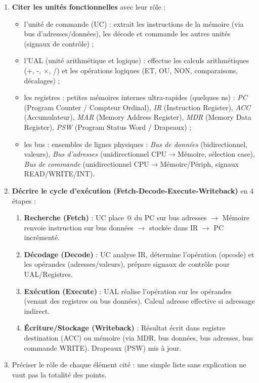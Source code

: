 \documentclass[11pt]{article}
\newcommand{\cle}[1]{{\popxbold\color{popdark}#1}}
\begin{document}
\begin{methode}
\begin{enumerate}
\item \textbf{Citer les unités fonctionnelles} avec leur rôle :
\begin{itemize}
\item l'\cle{unité de commande} (UC) : extrait les instructions de la mémoire (via bus d'adresses/données), les décode et commande les autres unités (signaux de contrôle) ;
\item l'\cle{UAL} (unité arithmétique et logique) : effectue les calculs arithmétiques (+, -, $\times$, /) et les opérations logiques (ET, OU, NON, comparaisons, décalages) ;
\item les \cle{registres} : petites mémoires internes ultra-rapides (quelques ns) : \emph{PC} (Program Counter / Compteur Ordinal), \emph{IR} (Instruction Register), \emph{ACC} (Accumulateur), \emph{MAR} (Memory Address Register), \emph{MDR} (Memory Data Register), \emph{PSW} (Program Status Word / Drapeaux) ;
\item les \cle{bus} : ensembles de lignes physiques : \emph{Bus de données} (bidirectionnel, valeurs), \emph{Bus d'adresses} (unidirectionnel CPU$\to$Mémoire, sélection case), \emph{Bus de commande} (unidirectionnel CPU$\to$Mémoire/Périph, signaux READ/WRITE/INT).
\end{itemize}
\item \textbf{Décrire le cycle d'exécution (Fetch-Decode-Execute-Writeback)} en 4 étapes :
\begin{enumerate}
\item \textbf{Recherche (Fetch)} : UC place @ du PC sur bus adresses $\to$ Mémoire renvoie instruction sur bus données $\to$ stockée dans IR $\to$ PC incrémenté.
\item \textbf{Décodage (Decode)} : UC analyse IR, détermine l'opération (opcode) et les opérandes (adresses/valeurs), prépare signaux de contrôle pour UAL/Registres.
\item \textbf{Exécution (Execute)} : UAL réalise l'opération sur les opérandes (venant des registres ou bus données). Calcul adresse effective si adressage indirect.
\item \textbf{Écriture/Stockage (Writeback)} : Résultat écrit dans registre destination (ACC) ou mémoire (via MDR, bus données, bus adresses, bus commande WRITE). Drapeaux (PSW) mis à jour.
\end{enumerate}
\item Préciser le rôle de chaque élément cité : une simple liste sans explication ne vaut pas la totalité des points.
\end{enumerate}
\end{methode}
\end{document}
